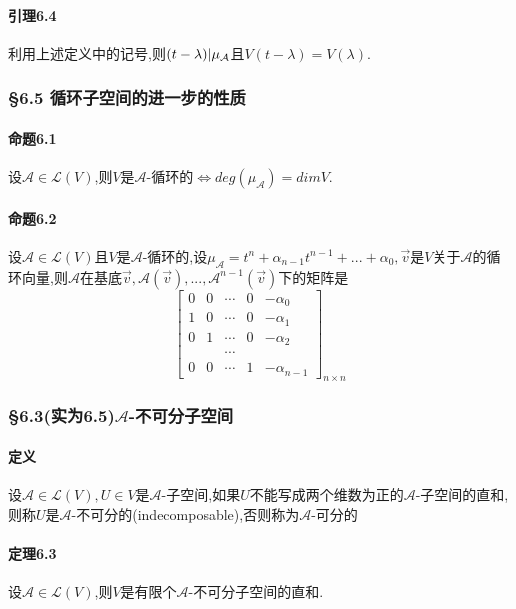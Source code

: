 \documentclass{ctexart}
\begin{document}
\paragraph{引理6.4}
利用上述定义中的记号,则$(t-\lambda) \arrowvert \mu_{\mathcal{A}}$且$V(t-\lambda) = V(\lambda)$.

\subsubsection{§6.5 循环子空间的进一步的性质}

\paragraph{命题6.1}
设$\mathcal{A} \in \mathcal{L}(V)$,则$V$是$\mathcal{A}$-循环的$\Leftrightarrow deg(\mu_\mathcal{A}) = dimV$.

\paragraph{命题6.2}
设$\mathcal{A} \in \mathcal{L}(V)$且$V$是$\mathcal{A}$-循环的,设$\mu_{\mathcal{A}} = t^{n}+\alpha_{n-1}t^{n-1}+...+\alpha_{0},\vec{v}$是$V$关于$\mathcal{A}$的循环向量,则$\mathcal{A}$在基底$\vec{v},\mathcal{A}(\vec{v}),...,\mathcal{A}^{n-1}(\vec{v})$下的矩阵是
$$
 \left[
 \begin{matrix}
  0 & 0 & \cdots & 0 & -\alpha_{0} \\
  1 & 0 & \cdots & 0 & -\alpha_{1} \\
  0 & 1 & \cdots & 0 & -\alpha_{2} \\
     &    & \cdots \\
  0 & 0 & \cdots & 1 & -\alpha_{n-1}
   
  \end{matrix}
  \right]_{n\times n}
$$
\subsubsection{§6.3(实为6.5)$\mathcal{A}$-不可分子空间}

\paragraph{定义}
设$\mathcal{A} \in \mathcal{L}(V),U \in V$是$\mathcal{A}$-子空间,如果$U$不能写成两个维数为正的$\mathcal{A}$-子空间的直和,则称$U$是$\mathcal{A}$-不可分的(indecomposable),否则称为$\mathcal{A}$-可分的

\paragraph{定理6.3}
设$\mathcal{A} \in \mathcal{L}(V)$,则$V$是有限个$\mathcal{A}$-不可分子空间的直和.

\end{document}
